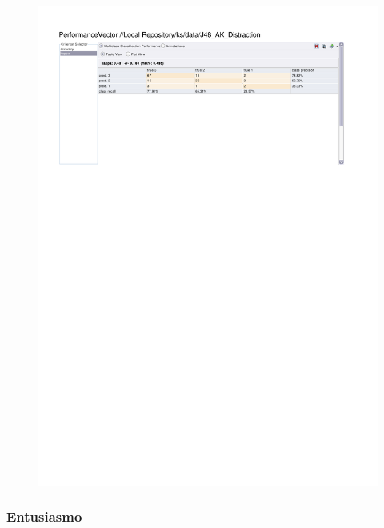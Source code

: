 \begin{figure}[htp]
  \centerline{\includegraphics[trim=0 682 0 60,clip,width=16.09cm]{results/J48_K_Distraction.pdf}} \caption{
} \label{J48_K_Distraction}
\end{figure}

\clearpage
\FloatBarrier
\subsubsection{Entusiasmo}

